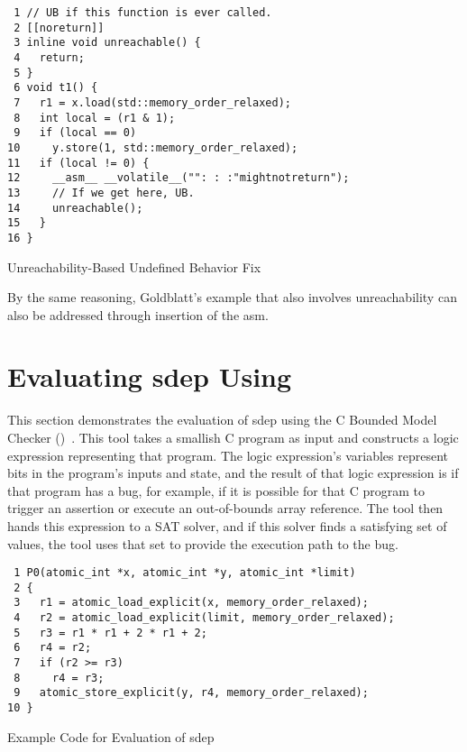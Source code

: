 \documentclass[10]{article}
\begin{document}
\begin{listing}[tbp]
\begin{verbatim}
 1 // UB if this function is ever called.
 2 [[noreturn]]
 3 inline void unreachable() {
 4   return;
 5 }
 6 void t1() {
 7   r1 = x.load(std::memory_order_relaxed);
 8   int local = (r1 & 1);
 9   if (local == 0)
10     y.store(1, std::memory_order_relaxed);
11   if (local != 0) {
12     __asm__ __volatile__("": : :"mightnotreturn");
13     // If we get here, UB.
14     unreachable();
15   }
16 }
\end{verbatim}
\caption{Unreachability-Based Undefined Behavior Fix}
\label{lst:Unreachability-Based Undefined Behavior Fix}
\end{listing}

By the same reasoning, Goldblatt's  example that
also involves unreachability can also be addressed through insertion
of the asm.

\section{Evaluating sdep Using }
\label{sec:Evaluating sdep Using cbmc}

This section demonstrates the evaluation of sdep using
the C Bounded Model Checker
()~\cite{EdmundClarke2004CBMC}.
This tool takes a smallish C program as input and constructs a logic
expression representing that program.
The logic expression's variables represent bits in the program's inputs
and state, and the result of that logic expression is  if that
program has a bug, for example, if it is possible for that C program to
trigger an assertion or execute an out-of-bounds array reference.
The tool then hands this expression to a SAT solver, and if this solver
finds a satisfying set of values, the tool uses that set to provide
the execution path to the bug.

\begin{listing}[tbp]
\scriptsize
\begin{verbatim}
 1 P0(atomic_int *x, atomic_int *y, atomic_int *limit)
 2 {
 3   r1 = atomic_load_explicit(x, memory_order_relaxed);
 4   r2 = atomic_load_explicit(limit, memory_order_relaxed);
 5   r3 = r1 * r1 + 2 * r1 + 2;
 6   r4 = r2;
 7   if (r2 >= r3)
 8     r4 = r3;
 9   atomic_store_explicit(y, r4, memory_order_relaxed);
10 }
\end{verbatim}
\caption{Example Code for Evaluation of sdep}
\label{lst:Example Code for Evaluation of sdep}
\end{listing}
\end{document}
